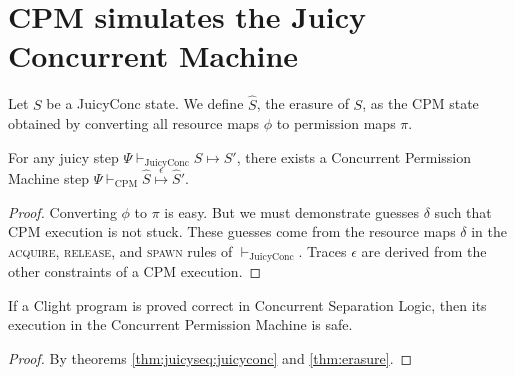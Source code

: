 \section{CPM simulates the Juicy Concurrent Machine}\label{sec:erasure}

\begin{definition}
\label{def:erasure}
  Let $S$ be a JuicyConc state.  We define $\hat S$, the erasure of $S$,
  as the CPM state obtained
  by converting all resource maps $\phi$ to permission maps $\pi$.
\end{definition}

\begin{theorem}[Erasure]
\label{thm:erasure}
  For any juicy step $\Psi \vdash_\mathrm{JuicyConc} S \mapsto S'$,
  there exists a Concurrent Permission Machine step
  $\Psi \vdash_\mathrm{CPM} \hat S
  \stackrel{\epsilon}\mapsto \hat S'$.
\end{theorem}
\begin{proof}
  Converting $\phi$ to $\pi$ is easy. But we must
  demonstrate guesses $\delta$ such that
  CPM execution is not stuck.  These guesses come from the
  resource maps $\delta$ in the \textsc{acquire},
  \textsc{release}, and \textsc{spawn} rules of $\vdash_\mathrm{JuicyConc}$.
  Traces $\epsilon$ are derived from the other constraints
  of a CPM execution.
\end{proof}

\begin{corollary}
\label{thm:csl-cpm-safe}
  If a Clight program is proved correct in Concurrent Separation Logic,
  then its execution in the Concurrent Permission Machine is safe.
\end{corollary}
\begin{proof}
By theorems \ref{thm:juicyseq:juicyconc} and
\ref{thm:erasure}.
\end{proof}

